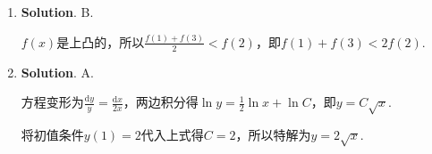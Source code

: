 \documentclass[../main.tex]{subfiles}
\begin{document}
\begin{enumerate}
          当$x\to-\infty$时，
          \[
              \lim_{x\to-\infty}\frac{\frac{1}{x}+\ln\left(1+\mathrm{e}^{x}\right)}{x}
              =0,\quad\lim_{x\to-\infty}\left[\frac{1}{x}+\ln\left(1+\mathrm{e}^{x}\right)\right
              ]=0,
          \]
          所以曲线$y=\frac{1}{x}+\ln\left(1+\mathrm{e}^{x}\right)$有水平渐近线$y=0$.

          故曲线$y=\frac{1}{x}+\ln\left(1+\mathrm{e}^{x}\right)$的渐近线条数为$3$.

    \item \textbf{Solution}. B.

          $f(x)$是上凸的，所以$\frac{f(1)+f(3)}{2}<f(2)$，即$f(1)+f(3)<2f(2)$.

    \item \textbf{Solution}. A.

          方程变形为$\frac{\mathrm{d}y}{y}=\frac{\mathrm{d}x}{2x}$，两边积分得$\ln y=
              \frac{1}{2}\ln x+\ln C$，即$y=C\sqrt{x}$.

          将初值条件$y(1)=2$代入上式得$C=2$，所以特解为$y=2\sqrt{x}$.
\end{enumerate}
\end{document}
